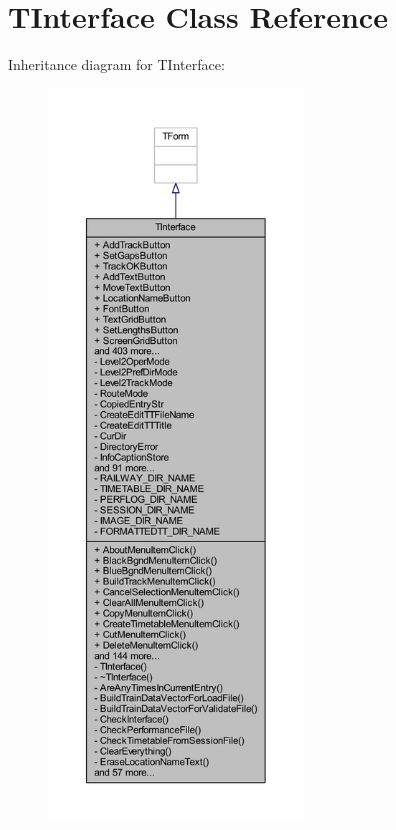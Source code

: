 \hypertarget{class_t_interface}{}\section{T\+Interface Class Reference}
\label{class_t_interface}


Inheritance diagram for T\+Interface\+:\nopagebreak
\begin{figure}[H]
\begin{center}
\leavevmode
\includegraphics[height=550pt]{class_t_interface__inherit__graph}
\end{center}
\end{figure}


